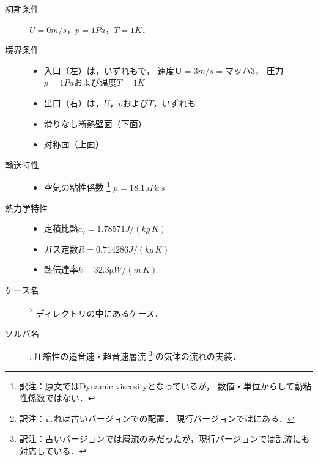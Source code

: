 \begin{description}
\begin{itemize}
            \end{itemize}
 \item[初期条件] $U = 0 \unit{m/s}$，$p = 1 \unit{Pa}$，$T = 1 \unit{K}$．
 \item[境界条件] \mbox{}
            \begin{itemize}
             \item 入口（左）は，いずれもで，
                   速度$\bm{U} = 3 \unit{m/s} = \text{マッハ}3$，
                   圧力$p = 1 \unit{Pa}$および温度$T = 1 \unit{K}$
             \item 出口（右）は，$U$，$p$および$T$，いずれも
             \item 滑りなし断熱壁面（下面）
             \item 対称面（上面）
            \end{itemize}
 \item[輸送特性] \mbox{}
            \begin{itemize}
             \item 空気の粘性係数%
\footnote{訳注：原文ではDynamic viscosityとなっているが，
数値・単位からして動粘性係数ではない．}%
                   $\mu = 18.1 \unit{\micro Pa\,s}$
            \end{itemize}
 \item[熱力学特性] \mbox{}
            \begin{itemize}
             \item 定積比熱$c_{\mathrm{v}} = 1.78571 \unit{J/(kg\,K)}$
             \item ガス定数$R = 0.714286 \unit{J/(kg\,K)}$
             \item 熱伝達率$k = 32.3 \unit{\micro W/(m\,K)}$
            \end{itemize}
 \item[ケース名] %
\footnote{訳注：これは古いバージョンでの配置．
現行バージョンではにある．}%
            ディレクトリの中にあるケース．
 \item[ソルバ名]
 : 圧縮性の遷音速・超音速層流%
\footnote{訳注：古いバージョンでは層流のみだったが，現行バージョンでは乱流にも対応している．}%
            の気体の流れの実装．
\end{description}

